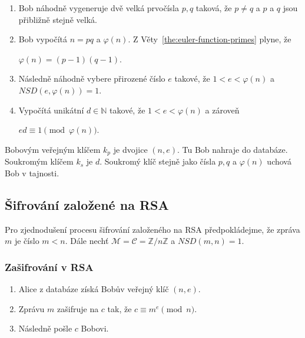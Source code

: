 \documentclass[
  program=infoi,
  biblatex,
  figures=false,
  glossaries,
  index
]{kidiplom}
\begin{document}
        \begin{enumerate}
            \item 
                Bob náhodně vygeneruje dvě velká prvočísla $p,q$ taková, že $p \neq q$ a $p$ a $q$ jsou přibližně stejně velká.
            \item
                Bob vypočítá $n=pq$ a $\varphi(n)$. Z Věty~\ref{the:euler-function-primes} plyne, že
                
                \begin{center}
                    $\varphi(n) = (p-1)(q-1)$.
                \end{center}
            \item
                Následně náhodně vybere přirozené číslo $e$ takové, že $1 < e < \varphi(n)$ a $NSD(e, \varphi(n)) = 1$.
            \item
                Vypočítá unikátní $d \in \mathbb{N}$ takové, že $1 < e < \varphi(n)$ a zároveň

                \begin{center}
                    $ed \equiv 1 \pmod{\varphi(n)}$.
                \end{center}
        \end{enumerate}

        Bobovým veřejným klíčem $k_p$ je dvojice $(n, e)$. Tu Bob nahraje do databáze.
        Soukromým klíčem $k_s$ je $d$. Soukromý klíč stejně jako čísla $p, q$ a $\varphi(n)$ uchová Bob v tajnosti.


    \subsection{Šifrování založené na RSA}

        Pro zjednodušení procesu šifrování založeného na RSA předpokládejme, že zpráva $m$ je číslo $m < n$.
        Dále nechť $\mathcal{M} = \mathcal{C} = \mathbb{Z}/n\mathbb{Z}$ a $NSD(m, n) = 1$.

        \subsubsection{Zašifrování v RSA}
            \begin{enumerate}
                \item 
                    Alice z databáze získá Bobův veřejný klíč $(n,e)$.
                \item
                    Zprávu $m$ zašifruje na $c$ tak, že $c \equiv m^e \pmod{n}$.
                \item    
                    Následně pošle $c$ Bobovi.
            \end{enumerate}
\end{document}
